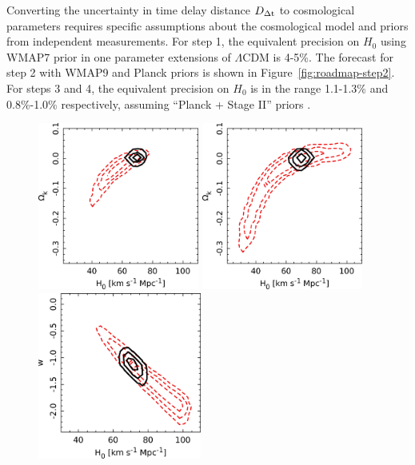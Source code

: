 Converting the uncertainty
in time delay distance $D_{\Delta{\rm t}}$ to cosmological parameters requires
specific assumptions about the cosmological model and priors from
independent measurements. For step 1, the equivalent precision on $H_0$
using WMAP7 prior in one parameter extensions of $\Lambda$CDM is 4-5\%.
The forecast for step 2 with WMAP9 and Planck priors is shown in
Figure~\ref{fig:roadmap-step2}. For steps 3 and 4, the equivalent
precision on $H_0$ is in the range 1.1-1.3\% and 0.8\%-1.0\%
respectively, assuming ``Planck + Stage II'' priors \citep{C+M09b}.


\begin{figure}
\begin{center}
\includegraphics[height=5.5cm,clip]{figures/planck_olcdm_c22lenses_stats.jpg}
\includegraphics[height=5.5cm,clip]{figures/wmap9_olcdm_c22lenses_stats.jpg}
\includegraphics[height=5.5cm,clip]{figures/planck_wcdm_c22lenses_stats.jpg}

\end{center}
\end{figure}
